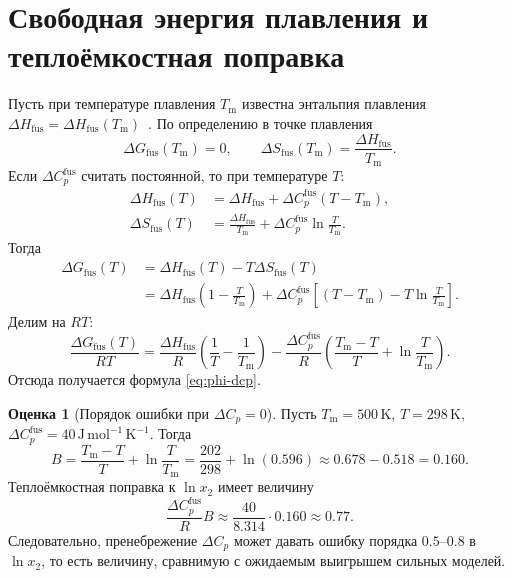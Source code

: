 \documentclass[11pt]{article}
\newcommand{\Tm}{T_{\mathrm m}}
\newcommand{\dHfus}{\Delta H_{\mathrm{fus}}}
\newcommand{\dCpfus}{\Delta C_p^{\mathrm{fus}}}
\theoremstyle{definition}
\newtheorem{estimate}{Оценка}[section]
\begin{document}
\section{Свободная энергия плавления и теплоёмкостная поправка}
\label{app:fusion}

Пусть при температуре плавления $\Tm$ известна энтальпия плавления $\dHfus=\Delta H_{\mathrm{fus}}(\Tm)$~\cite{acree2010,yalkowsky1979}. По определению в точке плавления
\begin{equation*}
    \Delta G_{\mathrm{fus}}(\Tm)=0,
    \qquad
    \Delta S_{\mathrm{fus}}(\Tm)=\frac{\dHfus}{\Tm}.
\end{equation*}
Если $\dCpfus$ считать постоянной, то при температуре $T$:
\begin{align*}
    \Delta H_{\mathrm{fus}}(T)
    &= \dHfus + \dCpfus(T-\Tm), \\
    \Delta S_{\mathrm{fus}}(T)
    &= \frac{\dHfus}{\Tm}+\dCpfus\ln\frac{T}{\Tm}.
\end{align*}
Тогда
\begin{align*}
    \Delta G_{\mathrm{fus}}(T)
    &= \Delta H_{\mathrm{fus}}(T)-T\Delta S_{\mathrm{fus}}(T) \\
    &= \dHfus\left(1-\frac{T}{\Tm}\right)
       +\dCpfus\left[(T-\Tm)-T\ln\frac{T}{\Tm}\right].
\end{align*}
Делим на $RT$:
\begin{equation*}
    \frac{\Delta G_{\mathrm{fus}}(T)}{RT}
    =\frac{\dHfus}{R}\left(\frac{1}{T}-\frac{1}{\Tm}\right)
    -\frac{\dCpfus}{R}\left(\frac{\Tm-T}{T}+\ln\frac{T}{\Tm}\right).
\end{equation*}
Отсюда получается формула \eqref{eq:phi-dcp}.

\begin{estimate}[Порядок ошибки при $\Delta C_p=0$]
Пусть $\Tm=500\,\mathrm{K}$, $T=298\,\mathrm{K}$, $\dCpfus=40\,\mathrm{J\,mol^{-1}\,K^{-1}}$. Тогда
\begin{equation*}
    B=\frac{\Tm-T}{T}+\ln\frac{T}{\Tm}
    =\frac{202}{298}+\ln(0.596)\approx 0.678-0.518=0.160.
\end{equation*}
Теплоёмкостная поправка к $\ln x_2$ имеет величину
\begin{equation*}
    \frac{\dCpfus}{R}B\approx \frac{40}{8.314}\cdot 0.160\approx 0.77.
\end{equation*}
Следовательно, пренебрежение $\Delta C_p$ может давать ошибку порядка $0.5$--$0.8$ в $\ln x_2$, то есть величину, сравнимую с ожидаемым выигрышем сильных моделей.
\end{estimate}
\end{document}
